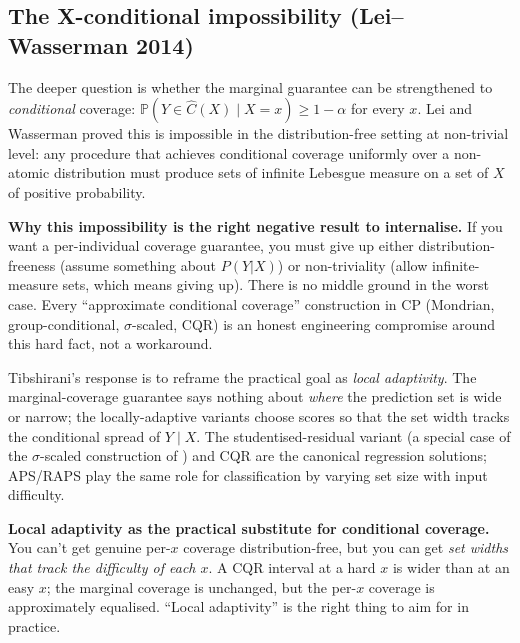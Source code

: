 \documentclass[letterpaper,11pt,leqno]{article}
\begin{document}
\subsection*{The X-conditional impossibility (Lei--Wasserman 2014)}

The deeper question is whether the marginal guarantee can be strengthened to \emph{conditional} coverage: $\mathbb{P}(Y \in \hat{C}(X) \mid X = x) \geq 1 - \alpha$ for every $x$. Lei and Wasserman \cite{lei2014distribution} proved this is impossible in the distribution-free setting at non-trivial level: any procedure that achieves conditional coverage uniformly over a non-atomic distribution must produce sets of infinite Lebesgue measure on a set of $X$ of positive probability.

\begin{whymatters}
\textbf{Why this impossibility is the right negative result to internalise.} If you want a per-individual coverage guarantee, you must give up either distribution-freeness (assume something about $P(Y|X)$) or non-triviality (allow infinite-measure sets, which means giving up). There is no middle ground in the worst case. Every ``approximate conditional coverage'' construction in CP (Mondrian, group-conditional, $\sigma$-scaled, CQR) is an honest engineering compromise around this hard fact, not a workaround.
\end{whymatters}

Tibshirani's response is to reframe the practical goal as \emph{local adaptivity}. The marginal-coverage guarantee says nothing about \emph{where} the prediction set is wide or narrow; the locally-adaptive variants choose scores so that the set width tracks the conditional spread of $Y \mid X$. The studentised-residual variant (a special case of the $\sigma$-scaled construction of \cite{lei2018distribution}) and CQR \cite{romano2019cqr} are the canonical regression solutions; APS/RAPS \cite{sadinle2019aps} play the same role for classification by varying set size with input difficulty.

\begin{keyinsight}
\textbf{Local adaptivity as the practical substitute for conditional coverage.} You can't get genuine per-$x$ coverage distribution-free, but you can get \emph{set widths that track the difficulty of each $x$}. A CQR interval at a hard $x$ is wider than at an easy $x$; the marginal coverage is unchanged, but the per-$x$ coverage is approximately equalised. ``Local adaptivity'' is the right thing to aim for in practice.
\end{keyinsight}
\end{document}
